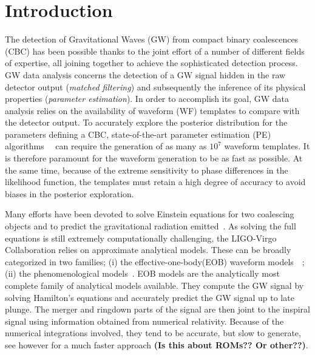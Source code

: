 \section{Introduction}
The detection of Gravitational Waves (GW) from compact binary coalescences (CBC) has been possible thanks to the joint effort of a number of different fields of expertise, all joining together to achieve the sophisticated detection process. GW data analysis concerns the detection of a GW signal hidden in the raw detector output (\textit{matched filtering}) and subsequently the inference of its physical properties (\textit{parameter estimation}). In order to accomplish its goal, GW data analysis relies on the availability of waveform (WF) templates to compare with the detector output.
To accurately explore the posterior distribution for the parameters defining a CBC, state-of-the-art parameter estimation (PE) algorithms~\cite{Aasi:2013jjl}~\cite{Veitch2014wba} can require the generation of as many as $10^7$ waveform templates. It is therefore paramount for the waveform generation to be as fast as possible. At the same time, because of the extreme sensitivity to phase differences in the likelihood  function, the templates must retain a high degree of accuracy to avoid biases in the posterior exploration.


Many efforts have been devoted to solve Einstein equations for two coalescing objects and to predict the gravitational radiation emitted~\cite{}.
As solving the full equations is still extremely computationally challenging, the LIGO-Virgo Collaboration relies on approximate analytical models. 
These can be broadly categorized in  two families; (i) the effective-one-body(EOB) waveform 
models~\cite{Damour1999EOB}~\cite{Damour2009EOB}; (ii) the phenomenological models~\cite{}. 
EOB models are the analytically most complete family of analytical models available. 
They compute the GW signal by solving Hamilton's equations and accurately predict the GW signal up to late plunge.
The merger and ringdown  parts of the signal are then joint to the inspiral signal using information obtained from numerical relativity. 
Because of the numerical integrations involved, they tend to be accurate, but slow to generate, see however \cite{} 
for a much faster approach \textbf{(Is this about ROMs?? Or other??)}. 

